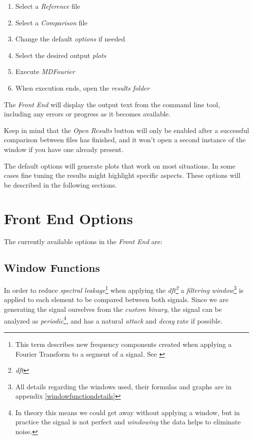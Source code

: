 \documentclass[10pt,a4paper]{report}
\newcommand{\define}[1] {
	\textit{\acrshort{#1}\footnote{\textit{\acrlong{#1}}}}}
\begin{document}
\begin{enumerate}
	\item Select a \textit{Reference} file
	\item Select a \textit{Comparison} file
	\item Change the default \textit{options} if needed
	\item Select the desired output \textit{plots}
	\item Execute \textit{MDFourier}
	\item When execution ends, open the \textit{results folder}
\end{enumerate}

The \textit{Front End} will display the output text from the command line tool, including any errors or progress as it becomes available.

Keep in mind that the \textit{Open Results} button will only be enabled after a successful comparison between files has finished, and it won't open a second instance of the window if you have one already present.

The default options will generate plots that work on most situations. In some cases fine tuning the results might highlight specific aspects. These options will be described in the following sections.

\section{Front End Options}

The currently available options in the \textit{Front End} are:

\subsection{Window Functions}
\label{windows}

In order to reduce \textit{spectral leakage}\footnote{This term describes new frequency components created when applying a Fourier Transform to a segment of a signal. See \cite{leakage}} when applying the \define{dft} a \textit{filtering window}\footnote{All details regarding the windows used, their formulas and graphs are in appendix \ref{windowfunctiondetails}} is applied to each element to be compared between both signals. Since we are generating the signal ourselves from the \textit{custom binary}, the signal can be analyzed as \textit{periodic}\footnote{In theory this means we could get away without applying a window, but in practice the signal is not perfect and \textit{windowing} the data helps to eliminate noise.}, and has a natural \textit{attack} and \textit{decay} rate if possible.
\end{document}
